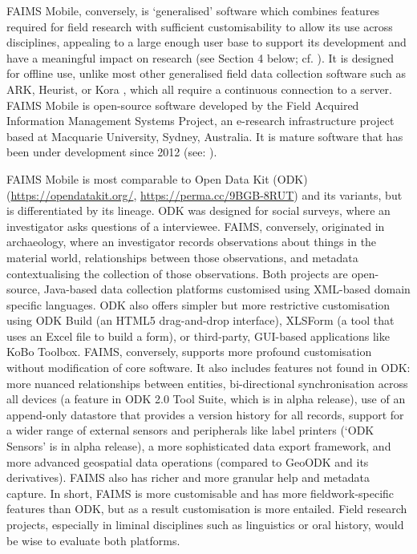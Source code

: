 \documentclass[preprint,12pt, a4paper]{elsarticle}
\begin{document}
FAIMS Mobile, conversely, is `generalised' software which combines features required for field research with sufficient customisability to allow its use across disciplines, appealing to a large enough user base to support its development and have a meaningful impact on research (see Section 4 below; cf. \cite{Sobotkova2016-mx}). It is designed for offline use, unlike most other generalised field data collection software such as ARK, Heurist, or Kora \cite{Gordon2016-xf}, which all require a continuous connection to a server. FAIMS Mobile is open-source software developed by the Field Acquired Information Management Systems Project, an e-research infrastructure project based at Macquarie University, Sydney, Australia. It is mature software that has been under development since 2012 (see: \cite{Ross2015-mo, Ross2013-dz, Sobotkova2015-lq}). 

FAIMS Mobile is most comparable to Open Data Kit (ODK) (\url{https://opendatakit.org/}, \url{https://perma.cc/9BGB-8RUT}) and its variants, but is differentiated by its lineage. ODK was designed for social surveys, where an investigator asks questions of a interviewee. FAIMS, conversely, originated in archaeology, where an investigator records observations about things in the material world, relationships between those observations, and metadata contextualising the collection of those observations. Both projects are open-source, Java-based data collection platforms customised using XML-based domain specific languages. ODK also offers simpler but more restrictive customisation using ODK Build (an HTML5 drag-and-drop interface), XLSForm (a tool that uses an Excel file to build a form), or third-party, GUI-based applications like KoBo Toolbox. FAIMS, conversely, supports more profound customisation without modification of core software. It also includes features not found in ODK: more nuanced relationships between entities, bi-directional synchronisation across all devices (a feature in ODK 2.0 Tool Suite, which is in alpha release), use of an append-only datastore that provides a version history for all records, support for a wider range of external sensors and peripherals like label printers (‘ODK Sensors’ is in alpha release), a more sophisticated data export framework, and more advanced geospatial data operations (compared to GeoODK and its derivatives). FAIMS also has richer and more granular help and metadata capture. In short, FAIMS is more customisable and has more fieldwork-specific features than ODK, but as a result customisation is more entailed. Field research projects, especially in liminal disciplines such as linguistics or oral history, would be wise to evaluate both platforms.
\end{document}
